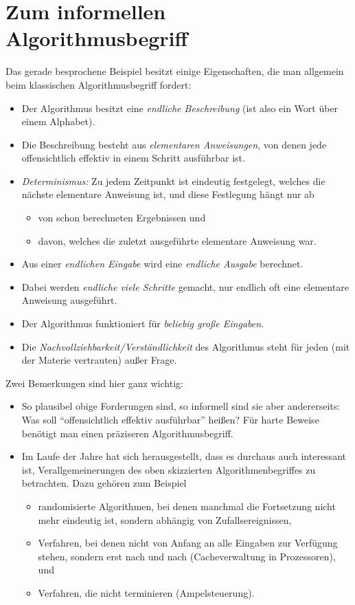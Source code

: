 \Tut\section{Zum informellen Algorithmusbegriff}
\label{sub:alg-informell}

Das gerade besprochene Beispiel besitzt einige Eigenschaften, die man
allgemein beim klassischen Algorithmusbegriff fordert:
%
\begin{itemize}
\item Der Algorithmus besitzt eine \emph{endliche Beschreibung} (ist
  also ein Wort über einem Alphabet).
\item Die Beschreibung besteht aus \emph{elementaren Anweisungen}, von
  denen jede offensichtlich effektiv in einem Schritt ausführbar ist.
\item \emph{Determinismus:} Zu jedem Zeitpunkt ist eindeutig
  festgelegt, welches die nächste elementare Anweisung ist, und
  diese Festlegung hängt nur ab
  \begin{itemize}
  \item von schon berechneten Ergebnissen und
   \item davon, welches die zuletzt ausgeführte elementare Anweisung
     war.
  \end{itemize}
\item Aus einer \emph{endlichen Eingabe} wird eine \emph{endliche
  Ausgabe} berechnet.
\item Dabei werden \emph{endliche viele Schritte} gemacht, \dh nur
  endlich oft eine elementare Anweisung ausgeführt.
\item Der Algorithmus funktioniert für \emph{beliebig große Eingaben.}
\item Die \emph{Nachvollziehbarkeit/Verständlichkeit} des Algorithmus
  steht für jeden (mit der Materie vertrauten) außer Frage.
\end{itemize}
%
Zwei Bemerkungen sind hier ganz wichtig:
%
\begin{itemize}
\item So plausibel obige Forderungen sind, so informell sind sie aber
  andererseits: Was soll \zB "`offensichtlich effektiv ausführbar"'
  heißen? Für harte Beweise benötigt man einen präziseren
  Algorithmusbegriff.
\item Im Laufe der Jahre hat sich herausgestellt, dass es durchaus
  auch interessant ist, Verallgemeinerungen des oben skizzierten
  Algorithmenbegriffes zu betrachten. Dazu gehören zum Beispiel
  \begin{itemize}
  \item randomisierte Algorithmen, bei denen manchmal die Fortsetzung
    nicht mehr eindeutig ist, sondern abhängig von Zufallsereignissen,
  \item Verfahren, bei denen nicht von Anfang an alle Eingaben zur
    Verfügung stehen, sondern erst nach und nach (\zB Cacheverwaltung
    in Prozessoren), und
  \item Verfahren, die nicht terminieren (\zB Ampelsteuerung).
  \end{itemize}
\end{itemize}
